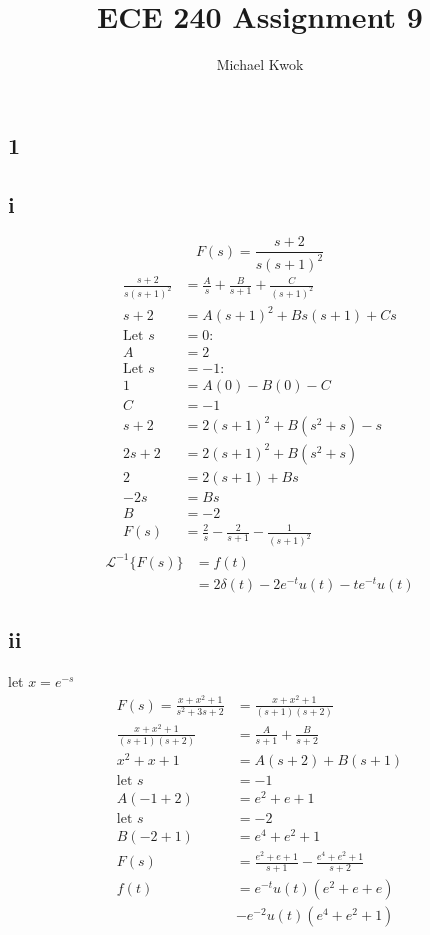 \documentclass{article}
\title{ECE 240 Assignment 9}
\author{Michael Kwok}
\begin{document}
\maketitle
\begin{multicols}{2}
\section*{1}
\subsection*{i}
$$F(s) = \frac{s+2}{s(s+1)^2}$$
\begin{align*}
    \frac{s+2}{s(s+1)^2} &= \frac{A}{s}+\frac{B}{s+1} + \frac{C}{(s+1)^2}\\
    s+2 &= A(s+1)^2 + Bs(s+1) + Cs\\
    \text{Let } s &= 0:\\
    A &= 2\\
    \text{Let } s &= -1:\\
    1 &= A(0) -B(0) -C\\
    C &= -1\\
    s+2 &= 2(s+1)^2 + B(s^2 + s) - s\\
    2s + 2 &= 2(s+1)^2 + B(s^2 + s)\\
    2 &= 2(s+1) + Bs\\
    -2s &= Bs\\
    B &= -2\\
    F(s) &= \frac{2}{s} - \frac{2}{s+1} - \frac{1}{(s+1)^2}
\end{align*}
\begin{align*}
\mathcal{L}^{-1}\{F(s)\} &= f(t)\\
&= 2\delta(t) - 2 e^{-t}u(t)-te^{-t}u(t)
\end{align*}
\subsection*{ii}
let $x = e^{-s}$
\begin{align*}
    F(s) = \frac{x+x^2+1}{s^2+3s+2} &= \frac{x+x^2+1}{(s+1)(s+2)}\\
    \frac{x+x^2+1}{(s+1)(s+2)} &= \frac{A}{s+1} + \frac{B}{s+2}\\
    x^2+x+1 &= A(s+2) + B (s+1)\\
    \text{let } s &= -1\\
    A(-1+2) &= e^2 + e + 1\\
    \text{let } s &= -2\\
    B(-2+1) &= e^4 + e^2 + 1\\
    F(s) &= \frac{e^2+e+1}{s+1} - \frac{e^4+e^2+1}{s+2}\\
    f(t) &= e^{-t}u(t)(e^2+e+e)\\
     &- e^{-2}u(t)(e^4+e^2+1)
\end{align*}

\end{multicols}
\end{document}
